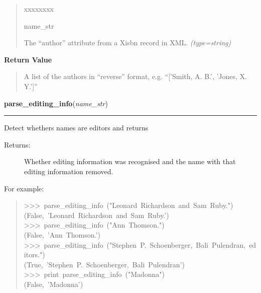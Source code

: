 \begin{boxedminipage}{\funcwidth}
\begin{quote}
\begin{Ventry}{xxxxxxxx}
          \item[name\_str]


The ``author'' attribute from a Xisbn record in XML.
            {\it (type=string)}

        \end{Ventry}

      \end{quote}

      \textbf{Return Value}
    \vspace{-1ex}

      \begin{quote}

A list of the authors in ``reverse'' format, e.g. ``{[}'Smith, A. B.',
'Jones, X. Y.'{]}''
      \end{quote}

    \end{boxedminipage}

    \label{biblio:webquery:utils:parse_editing_info}

    \vspace{0.5ex}

\hspace{.8\funcindent}\begin{boxedminipage}{\funcwidth}

    \raggedright \textbf{parse\_editing\_info}(\textit{name\_str})

    \vspace{-1.5ex}

    \rule{\textwidth}{0.5\fboxrule}
\setlength{\parskip}{2ex}

Detect whethers names are editors and returns
\begin{description}
\item[{Returns:}] \leavevmode 
Whether editing information was recognised and the name with that
editing information removed.

\end{description}

For example:
\begin{quote}{\ttfamily \raggedright \noindent
>{}>{}>~parse{\_}editing{\_}info~("Leonard~Richardson~and~Sam~Ruby.")~\\
(False,~'Leonard~Richardson~and~Sam~Ruby.')~\\
>{}>{}>~parse{\_}editing{\_}info~("Ann~Thomson.")~\\
(False,~'Ann~Thomson.')~\\
>{}>{}>~parse{\_}editing{\_}info~("Stephen~P.~Schoenberger,~Bali~Pulendran,~editors.")~\\
(True,~'Stephen~P.~Schoenberger,~Bali~Pulendran')~\\
>{}>{}>~print~parse{\_}editing{\_}info~("Madonna")~\\
(False,~'Madonna')
}\end{quote}
\setlength{\parskip}{1ex}
    \end{boxedminipage}


